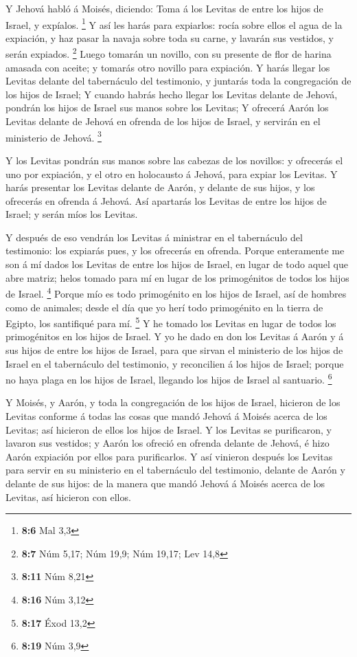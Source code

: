  Y Jehová habló á Moisés, diciendo:  Toma á
los Levitas de entre los hijos de Israel, y expíalos. \footnote{\textbf{8:6}
  Mal 3,3}  Y así les harás para expiarlos: rocía sobre
ellos el agua de la expiación, y haz pasar la navaja sobre toda su
carne, y lavarán sus vestidos, y serán expiados. \footnote{\textbf{8:7}
  Núm 5,17; Núm 19,9; Núm 19,17; Lev 14,8}  Luego tomarán
un novillo, con su presente de flor de harina amasada con aceite; y
tomarás otro novillo para expiación.  Y harás llegar los
Levitas delante del tabernáculo del testimonio, y juntarás toda la
congregación de los hijos de Israel;  Y cuando habrás
hecho llegar los Levitas delante de Jehová, pondrán los hijos de Israel
sus manos sobre los Levitas;  Y ofrecerá Aarón los
Levitas delante de Jehová en ofrenda de los hijos de Israel, y servirán
en el ministerio de Jehová. \footnote{\textbf{8:11} Núm 8,21}

 Y los Levitas pondrán sus manos sobre las cabezas de los
novillos: y ofrecerás el uno por expiación, y el otro en holocausto á
Jehová, para expiar los Levitas.  Y harás presentar los
Levitas delante de Aarón, y delante de sus hijos, y los ofrecerás en
ofrenda á Jehová.  Así apartarás los Levitas de entre los
hijos de Israel; y serán míos los Levitas.

 Y después de eso vendrán los Levitas á ministrar en el
tabernáculo del testimonio: los expiarás pues, y los ofrecerás en
ofrenda.  Porque enteramente me son á mí dados los
Levitas de entre los hijos de Israel, en lugar de todo aquel que abre
matriz; helos tomado para mí en lugar de los primogénitos de todos los
hijos de Israel. \footnote{\textbf{8:16} Núm 3,12} 
Porque mío es todo primogénito en los hijos de Israel, así de hombres
como de animales; desde el día que yo herí todo primogénito en la tierra
de Egipto, los santifiqué para mí. \footnote{\textbf{8:17} Éxod 13,2}
 Y he tomado los Levitas en lugar de todos los
primogénitos en los hijos de Israel.  Y yo he dado en don
los Levitas á Aarón y á sus hijos de entre los hijos de Israel, para que
sirvan el ministerio de los hijos de Israel en el tabernáculo del
testimonio, y reconcilien á los hijos de Israel; porque no haya plaga en
los hijos de Israel, llegando los hijos de Israel al santuario.
\footnote{\textbf{8:19} Núm 3,9}

 Y Moisés, y Aarón, y toda la congregación de los hijos
de Israel, hicieron de los Levitas conforme á todas las cosas que mandó
Jehová á Moisés acerca de los Levitas; así hicieron de ellos los hijos
de Israel.  Y los Levitas se purificaron, y lavaron sus
vestidos; y Aarón los ofreció en ofrenda delante de Jehová, é hizo Aarón
expiación por ellos para purificarlos.  Y así vinieron
después los Levitas para servir en su ministerio en el tabernáculo del
testimonio, delante de Aarón y delante de sus hijos: de la manera que
mandó Jehová á Moisés acerca de los Levitas, así hicieron con ellos.

